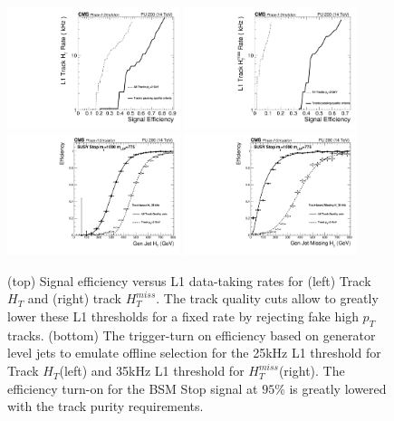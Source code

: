 \begin{figure}[htbp!]
\includegraphics[width=0.45\textwidth ]{SignalEfficiencyVsRate_TkHT.pdf}
\includegraphics[width=0.45\textwidth ]{SignalEfficiencyVsRate_TkMHT.pdf}\\
\includegraphics[width=0.45\textwidth ]{TurnOnTrackHT.pdf}
\includegraphics[width=0.45\textwidth ]{TurnOnTrackMHT.pdf}

\caption{(top) Signal efficiency versus L1 data-taking rates for (left) Track $H_{T}$ and (right) track $H^{miss}_{T}$. The track quality cuts allow to greatly lower these L1 thresholds for a fixed rate by rejecting fake high $p_{T}$ tracks. (bottom) The trigger-turn on efficiency based on generator level jets to emulate offline selection for the 25kHz L1 threshold for Track $H_{T}$(left) and 35kHz L1 threshold for $H^{miss}_{T}$(right). The efficiency turn-on for the BSM Stop signal at $95\%$ is greatly lowered with the track purity requirements.}
\label{fig:TkPurityImprov}
\end{figure}

